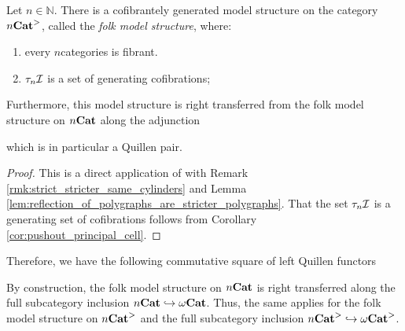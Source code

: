 \begin{thm} \label{thm:folk_model_structure_on_stricter_n}
    Let \( n \in \mathbb{N} \).
    There is a cofibrantely generated model structure on the category \( {n\mathbf{Cat}}^> \), called the \emph{folk model structure}, where:
    \begin{enumerate}
        \item every \( n \)\nbd categories is fibrant.
        \item \( \tau_{n}\mathcal{I} \) is a set of generating cofibrations;
    \end{enumerate}
    Furthermore, this model structure is right transferred from the folk model structure on \( {n\mathbf{Cat}} \) along the adjunction 
    \begin{center}
    \end{center}
    which is in particular a Quillen pair.
\end{thm}
\begin{proof}
    This is a direct application of \cite[Proposition 21.3.2]{ara2025polygraphs} with Remark \ref{rmk:strict_stricter_same_cylinders} and Lemma \ref{lem:reflection_of_polygraphs_are_stricter_polygraphs}.
    That the set \( \tau_{n}\mathcal{I} \) is a generating set of cofibrations follows from Corollary \ref{cor:pushout_principal_cell}.
\end{proof}

\noindent Therefore, we have the following commutative square of left Quillen functors
\begin{center}
\end{center}


\begin{rmk}\label{rmk:also_right_transferred_n_folk}
    By construction, the folk model structure on \( {n\mathbf{Cat}} \) is right transferred along the full subcategory inclusion \( {n\mathbf{Cat}} \hookrightarrow {\omega\mathbf{Cat}} \).
    Thus, the same applies for the folk model structure on \( {n\mathbf{Cat}}^> \) and the full subcategory inclusion \( {n\mathbf{Cat}}^> \hookrightarrow {\omega\mathbf{Cat}}^> \).
\end{rmk}


